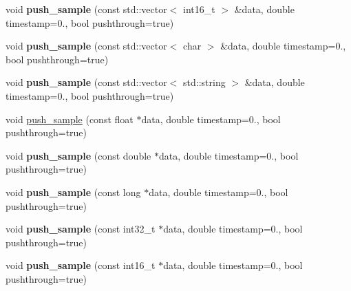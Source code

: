 \begin{DoxyCompactItemize}
\item 
\mbox{\label{classlsl_1_1stream__outlet_a66a528d5f31f5b5f747994c6de35a80f}} 
void {\bfseries push\+\_\+sample} (const std\+::vector$<$ int16\+\_\+t $>$ \&data, double timestamp=0., bool pushthrough=true)
\item 
\mbox{\label{classlsl_1_1stream__outlet_a510668a6adc032792e8bad06458e58eb}} 
void {\bfseries push\+\_\+sample} (const std\+::vector$<$ char $>$ \&data, double timestamp=0., bool pushthrough=true)
\item 
\mbox{\label{classlsl_1_1stream__outlet_a59f69780061e6c8743a4cb566944033b}} 
void {\bfseries push\+\_\+sample} (const std\+::vector$<$ std\+::string $>$ \&data, double timestamp=0., bool pushthrough=true)
\item 
void \hyperlink{classlsl_1_1stream__outlet_a24192e6e3416ad36154bc01be55334c3}{push\+\_\+sample} (const float $\ast$data, double timestamp=0., bool pushthrough=true)
\item 
\mbox{\label{classlsl_1_1stream__outlet_af0d747a0610be04501117f87c1b010e9}} 
void {\bfseries push\+\_\+sample} (const double $\ast$data, double timestamp=0., bool pushthrough=true)
\item 
\mbox{\label{classlsl_1_1stream__outlet_a558af80f807399556a2483346e80b935}} 
void {\bfseries push\+\_\+sample} (const long $\ast$data, double timestamp=0., bool pushthrough=true)
\item 
\mbox{\label{classlsl_1_1stream__outlet_aff1709d7bbf628e9b14d18444c7ac237}} 
void {\bfseries push\+\_\+sample} (const int32\+\_\+t $\ast$data, double timestamp=0., bool pushthrough=true)
\item 
\mbox{\label{classlsl_1_1stream__outlet_ae67672d4aa82d500e0a192d38f64d6fe}} 
void {\bfseries push\+\_\+sample} (const int16\+\_\+t $\ast$data, double timestamp=0., bool pushthrough=true)
\item 
\mbox{\label{classlsl_1_1stream__outlet_acbb1a237bb410d9794c1961922aca6ad}} 

\end{DoxyCompactItemize}
